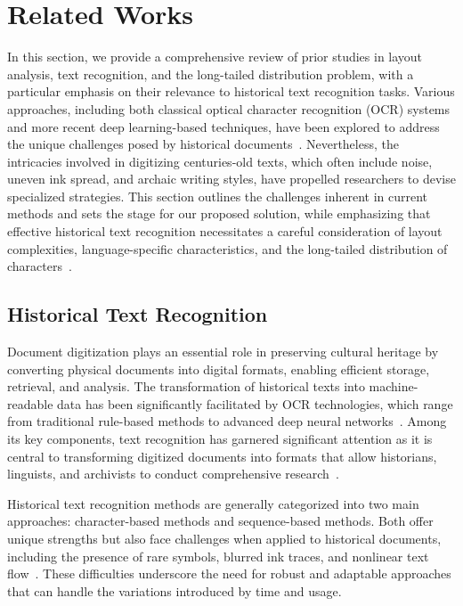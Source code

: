 \section{Related Works}
\label{sec:related_works}

In this section, we provide a comprehensive review of prior studies in layout analysis, text recognition, and the long-tailed distribution problem, with a particular emphasis on their relevance to historical text recognition tasks. Various approaches, including both classical optical character recognition (OCR) systems and more recent deep learning-based techniques, have been explored to address the unique challenges posed by historical documents~\cite{liu2019survey, bishop2006pattern}. Nevertheless, the intricacies involved in digitizing centuries-old texts, which often include noise, uneven ink spread, and archaic writing styles, have propelled researchers to devise specialized strategies. This section outlines the challenges inherent in current methods and sets the stage for our proposed solution, while emphasizing that effective historical text recognition necessitates a careful consideration of layout complexities, language-specific characteristics, and the long-tailed distribution of characters~\cite{jla}.

\subsection{Historical Text Recognition}

Document digitization plays an essential role in preserving cultural heritage by converting physical documents into digital formats, enabling efficient storage, retrieval, and analysis. The transformation of historical texts into machine-readable data has been significantly facilitated by OCR technologies, which range from traditional rule-based methods to advanced deep neural networks~\cite{conway2010, yadav2021handwritten}. Among its key components, text recognition has garnered significant attention as it is central to transforming digitized documents into formats that allow historians, linguists, and archivists to conduct comprehensive research~\cite{jla}.

Historical text recognition methods are generally categorized into two main approaches: character-based methods and sequence-based methods. Both offer unique strengths but also face challenges when applied to historical documents, including the presence of rare symbols, blurred ink traces, and nonlinear text flow~\cite{chetarly22}. These difficulties underscore the need for robust and adaptable approaches that can handle the variations introduced by time and usage.

